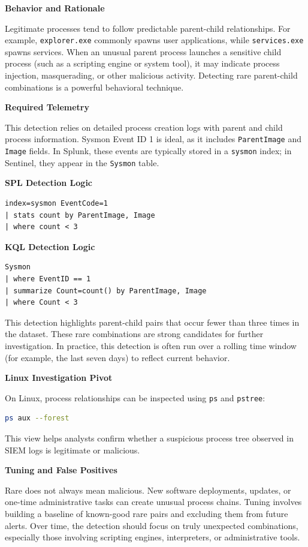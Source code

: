 \textbf{Behavior and Rationale}

Legitimate processes tend to follow predictable parent-child relationships. For example, \texttt{explorer.exe} commonly spawns user applications, while \texttt{services.exe} spawns services. When an unusual parent process launches a sensitive child process (such as a scripting engine or system tool), it may indicate process injection, masquerading, or other malicious activity. Detecting rare parent-child combinations is a powerful behavioral technique.

\textbf{Required Telemetry}

This detection relies on detailed process creation logs with parent and child process information. Sysmon Event ID 1 is ideal, as it includes \texttt{ParentImage} and \texttt{Image} fields. In Splunk, these events are typically stored in a \texttt{sysmon} index; in Sentinel, they appear in the \texttt{Sysmon} table.

\textbf{SPL Detection Logic}
\begin{lstlisting}
index=sysmon EventCode=1
| stats count by ParentImage, Image
| where count < 3
\end{lstlisting}

\textbf{KQL Detection Logic}
\begin{lstlisting}
Sysmon
| where EventID == 1
| summarize Count=count() by ParentImage, Image
| where Count < 3
\end{lstlisting}

This detection highlights parent-child pairs that occur fewer than three times in the dataset. These rare combinations are strong candidates for further investigation. In practice, this detection is often run over a rolling time window (for example, the last seven days) to reflect current behavior.

\textbf{Linux Investigation Pivot}

On Linux, process relationships can be inspected using \texttt{ps} and \texttt{pstree}:

\begin{lstlisting}[language=bash]
ps aux --forest
\end{lstlisting}

This view helps analysts confirm whether a suspicious process tree observed in SIEM logs is legitimate or malicious.

\textbf{Tuning and False Positives}

Rare does not always mean malicious. New software deployments, updates, or one-time administrative tasks can create unusual process chains. Tuning involves building a baseline of known-good rare pairs and excluding them from future alerts. Over time, the detection should focus on truly unexpected combinations, especially those involving scripting engines, interpreters, or administrative tools.

